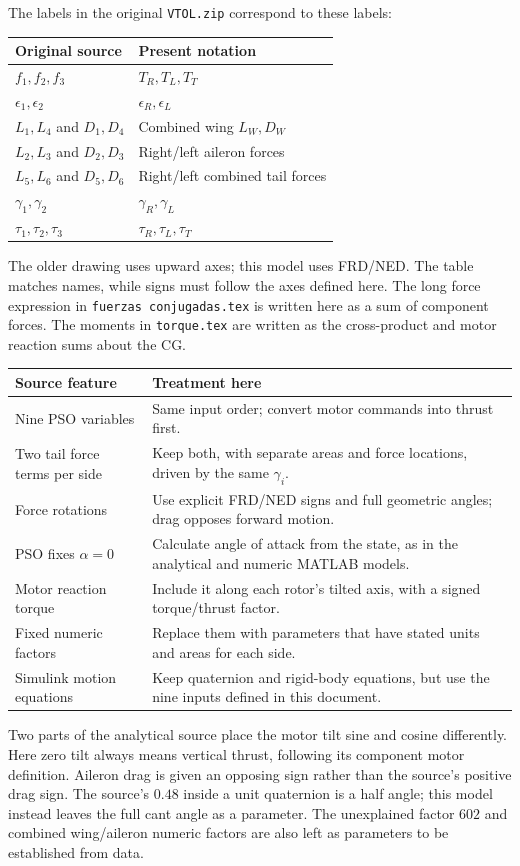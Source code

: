 \documentclass[11pt,a4paper]{article}
\numberwithin{equation}{section}
\begin{document}
The labels in the original \texttt{VTOL.zip} correspond to these labels:
\begin{center}
\begin{tabular}{ll}
\hline
Original source & Present notation \\
\hline
$f_1,f_2,f_3$ & $T_R,T_L,T_T$ \\
$\epsilon_1,\epsilon_2$ & $\epsilon_R,\epsilon_L$ \\
$L_1,L_4$ and $D_1,D_4$ & Combined wing $L_W,D_W$ \\
$L_2,L_3$ and $D_2,D_3$ & Right/left aileron forces \\
$L_5,L_6$ and $D_5,D_6$ & Right/left combined tail forces \\
$\gamma_1,\gamma_2$ & $\gamma_R,\gamma_L$ \\
$\tau_1,\tau_2,\tau_3$ & $\tau_R,\tau_L,\tau_T$ \\
\hline
\end{tabular}
\end{center}
The older drawing uses upward axes; this model uses FRD/NED.
The table matches names, while signs must follow the axes defined here.
The long force expression in \texttt{fuerzas conjugadas.tex} is written here
as a sum of component forces. The moments in \texttt{torque.tex} are written
as the cross-product and motor reaction sums about the CG.
\begin{center}
\begin{tabular}{p{}p{}}
\hline
Source feature & Treatment here \\
\hline
Nine PSO variables & Same input order; convert motor commands into thrust first. \\
Two tail force terms per side & Keep both, with separate areas and force locations, driven by the same $\gamma_i$. \\
Force rotations & Use explicit FRD/NED signs and full geometric angles; drag opposes forward motion. \\
PSO fixes $\alpha=0$ & Calculate angle of attack from the state, as in the analytical and numeric MATLAB models. \\
Motor reaction torque & Include it along each rotor's tilted axis, with a signed torque/thrust factor. \\
Fixed numeric factors & Replace them with parameters that have stated units and areas for each side. \\
Simulink motion equations & Keep quaternion and rigid-body equations, but use the nine inputs defined in this document. \\
\hline
\end{tabular}
\end{center}
Two parts of the analytical source place the motor tilt sine and cosine
differently. Here zero tilt always means vertical thrust, following its
component motor definition. Aileron drag is given an opposing sign rather
than the source's positive drag sign. The source's $0.48$ inside a unit
quaternion is a half angle; this model instead leaves the full cant angle
as a parameter. The unexplained factor $602$ and combined wing/aileron
numeric factors are also left as parameters to be established from data.
\end{document}
